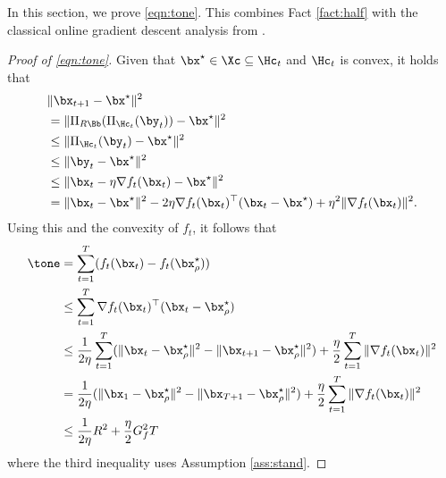 In this section, we prove \eqref{eqn:tone}.
This combines Fact \ref{fact:half} with the classical online gradient descent analysis from \cite{zinkevich2003online}.

\begin{proof}[Proof of \eqref{eqn:tone}]
    Given that $\bx^\star \in \Xc \subseteq \Hc_t$ and $\Hc_t$ is convex, it holds that
    \begin{align*}
        & \| \bx_{t+1} - \bx^\star \|^2\\
        & = \| \Pi_{R \Bb} (\Pi_{\Hc_t} (\by_t)) - \bx^\star \|^2\\
        & \leq \| \Pi_{\Hc_t} (\by_t) - \bx^\star \|^2\\
        & \leq \| \by_t - \bx^\star \|^2\\
        & \leq \| \bx_t - \eta \nabla f_t(\bx_t) - \bx^\star \|^2\\
        & = \| \bx_t - \bx^\star \|^2 - 2 \eta \nabla f_t(\bx_t)^\top (\bx_t - \bx^\star) + \eta^2 \| \nabla f_t(\bx_t) \|^2.
    \end{align*}
    Using this and the convexity of $f_t$, it follows that
    \begin{align*}
        \tone & = \sum_{t=1}^{T} (f_t(\bx_t) - f_t(\bx^\star_\rho))\\
        & \leq \sum_{t=1}^{T} \nabla f_t(\bx_t)^\top (\bx_t - \bx^\star_\rho)\\
        & \leq \frac{1}{2 \eta} \sum_{t=1}^{T} (\| \bx_t - \bx^\star_\rho \|^2 - \| \bx_{t+1} - \bx^\star_\rho \|^2) + \frac{\eta}{2} \sum_{t=1}^{T} \| \nabla f_t(\bx_t) \|^2\\
        & = \frac{1}{2 \eta} (\| \bx_1 - \bx^\star_\rho \|^2 - \| \bx_{T+1} - \bx^\star_\rho \|^2) + \frac{\eta}{2} \sum_{t=1}^{T} \| \nabla f_t(\bx_t) \|^2\\
        & \leq \frac{1}{2 \eta} R^2 + \frac{\eta}{2} G_f^2 T
    \end{align*}
    where the third inequality uses Assumption \ref{ass:stand}.
\end{proof}

